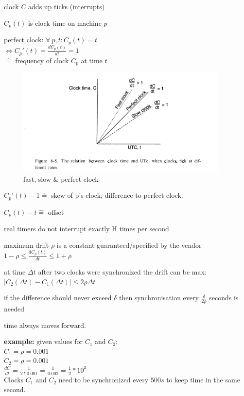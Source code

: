 \documentclass[ngerman,a4paper]{report}
\begin{document}
\begin{compactitem}
	\item clock $C$ adds up ticks (interrupts)
	\item $C_p(t)$ is clock time on machine $p$
	\item perfect clock: $\forall \  p, t : C_p(t) = t $ \\
	$\Longleftrightarrow C_p'(t) = \frac{d C_p(t)}{dt} = 1$\\
	$\mathrel{\widehat{=}}$ frequency of clock $C_p$ at time $t$

\begin{figure}[h]
	\centering
	\includegraphics[width=400px]{gfx/clock-drift.png}
	\caption{fast, slow \& perfect clock}
	\label{img:clock-drift}
\end{figure}

	\item $C_p'(t) - 1 \mathrel{\widehat{=}}$ skew of p's clock, difference to perfect clock.
	\item $C_p(t)-t \mathrel{\widehat{=}}$ offset
	\item real timers do not interrupt exactly H times per second
	\item maximum drift $\rho$ is a constant guaranteed/specified by the vendor \\
	$1-\rho \leq \frac{d C_p(t)}{dt} \leq 1 + \rho$

	\item at time $\Delta t$ after two clocks were synchronized the drift can be max: \\
	$|C_2(\Delta t) - C_1(\Delta t) | \leq 2 \rho \Delta t$
	\item if the difference should never exceed $\delta$ then synchronisation every $\frac {\delta}{2 \rho}$ seconds is needed
	\item time always moves forward.
\end{compactitem}

\textbf{example:} given values for $C_1$ and $C_2$:\\
$C_1 = \rho = 0.001$\\
$C_2 = \rho = 0.001$\\
$\frac{dC}{dt} = \frac {1}{2 * 0.001} = \frac{1}{0.002} = \frac{1}{2} * 10^{3}$\\
Clocks $C_1$ and $C_2$ need to be synchronized every $500s$ to keep time in the same second.\\
\end{document}

